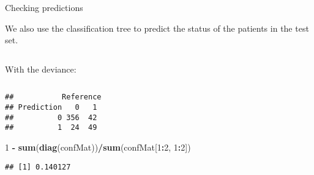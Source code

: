 \documentclass[10pt,ignorenonframetext,]{beamer}
\newenvironment{Shaded}{\begin{snugshade}}{\end{snugshade}}
\newcommand{\DataTypeTok}[1]{\textcolor[rgb]{0.13,0.29,0.53}{#1}}
\newcommand{\DecValTok}[1]{\textcolor[rgb]{0.00,0.00,0.81}{#1}}
\newcommand{\KeywordTok}[1]{\textcolor[rgb]{0.13,0.29,0.53}{\textbf{#1}}}
\newcommand{\NormalTok}[1]{#1}
\newcommand{\OperatorTok}[1]{\textcolor[rgb]{0.81,0.36,0.00}{\textbf{#1}}}
\newcommand{\StringTok}[1]{\textcolor[rgb]{0.31,0.60,0.02}{#1}}
\begin{document}
\begin{frame}[fragile]

\begin{block}{Checking predictions}

\vspace{2mm}

We also use the classification tree to predict the status of the
patients in the test set.

\(~\)

With the deviance:

\(~\)

\tiny

\begin{Shaded}
\end{Shaded}

\begin{verbatim}
##           Reference
## Prediction   0   1
##          0 356  42
##          1  24  49
\end{verbatim}

\begin{Shaded}
\begin{Highlighting}[]
\DecValTok{1} \OperatorTok{-}\StringTok{ }\KeywordTok{sum}\NormalTok{(}\KeywordTok{diag}\NormalTok{(confMat))}\OperatorTok{/}\KeywordTok{sum}\NormalTok{(confMat[}\DecValTok{1}\OperatorTok{:}\DecValTok{2}\NormalTok{, }\DecValTok{1}\OperatorTok{:}\DecValTok{2}\NormalTok{])}
\end{Highlighting}
\end{Shaded}

\begin{verbatim}
## [1] 0.140127
\end{verbatim}

\end{block}

\end{frame}
\end{document}
